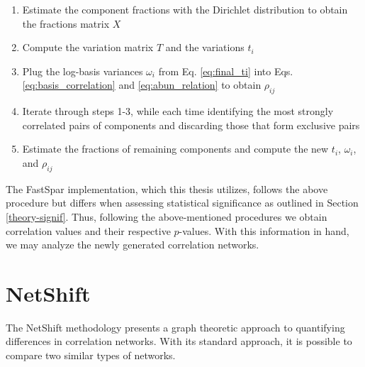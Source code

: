 \begin{enumerate}
\item  Estimate the component fractions with the Dirichlet distribution to obtain the fractions matrix $X$
\item Compute the variation matrix $T$ and the variations $t_i$
\item Plug the log-basis variances $\omega_i$ from Eq. \ref{eq:final_ti} into Eqs. \ref{eq:basis_correlation} and \ref{eq:abun_relation} to obtain $\rho_{ij}$
\item Iterate through steps 1-3, while each time identifying the most strongly correlated pairs of components and discarding those that form exclusive pairs
\item Estimate the fractions of remaining components and compute the new $t_i$, $\omega_i$, and $\rho_{ij}$
\end{enumerate}

The \acrshort{FastSpar} implementation, which this thesis utilizes, follows the above procedure but differs when assessing statistical significance as outlined in Section \ref{theory-signif}. Thus, following the above-mentioned procedures we obtain correlation values and their respective $p$-values. With this information in hand, we may analyze the newly generated correlation networks.




\section{NetShift}\label{theory-Netshift}
The NetShift methodology presents a graph theoretic approach to quantifying differences in correlation networks. With its standard approach, it is possible to compare two similar types of networks.   

